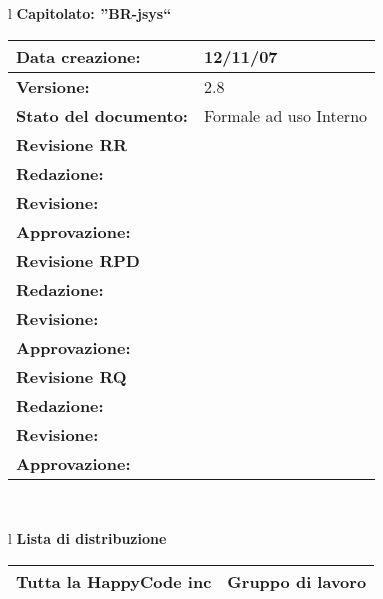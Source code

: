 

\newcommand{\lv}{ 2.8 } %
\newcommand{\dt}{ Norme Di Progetto }%



\begin{center}
\thispagestyle{plain}
\begin{table}[htbp]
\large{
\begin{tabular}{l}
\Large{\textbf{\textsf{Capitolato: ''BR-jsys``}}} \\
\begin{tabular}{|p{6cm}|p{6cm}|}
\hline
\textbf{Data creazione:} & 12/11/07 \\
\hline
\textbf{Versione:} & \lv \\ \hline
\textbf{Stato del documento:} & Formale ad uso Interno \\ \hline
\textbf{Revisione RR} &      \\ \hline
\textbf{Redazione:} & \FC \\ \hline
\textbf{Revisione:} & \MT \\ \hline
\textbf{Approvazione:}  & \ET \\ \hline
\textbf{Revisione RPD} & \\ \hline
\textbf{Redazione:} & \ET \\ \hline
\textbf{Revisione:} & \FC \\ \hline
\textbf{Approvazione:} & \MM \\ \hline
\textbf{Revisione RQ} & \\ \hline
\textbf{Redazione:} & \MT \\ \hline
\textbf{Revisione:} &  \ET\\ \hline
\textbf{Approvazione:} &  \AT\\ \hline
\end{tabular} \\
\end{tabular}
}
\end{table}

\begin{table}[hbtp]
\large{
\begin{tabular}{l}
\Large{\textbf{\textsf{Lista di distribuzione}}} \\
\begin{tabular}{|p{6cm}|p{6cm}|} \hline
{Tutta la HappyCode inc}& Gruppo di lavoro \\ \hline
\end{tabular} \\
\end{tabular}
}
\end{table}


\end{center}
